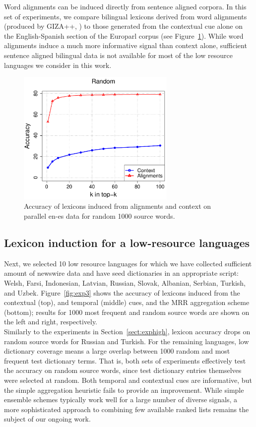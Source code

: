 \documentclass{article}
\newcommand{\mtodo}[1]{}
\newcommand{\secref}[1]{Section~\ref{#1}}
\newcommand{\figref}[1]{Figure~\ref{#1}}
\begin{document}
Word alignments can be induced directly from sentence aligned corpora.  In this set of experiments, we compare bilingual lexicons derived from word alignments (produced by GIZA++, \cite{Och:2003}) to those generated from the contextual cue alone on the English-Spanish section of the Europarl corpus (see \figref{fig:exp2}). While word alignments induce a much more informative signal than context alone, sufficient sentence aligned bilingual data is not available for most of the low resource languages we consider in this work.\\

\begin{figure}[h!]
\centerline{\mbox{\includegraphics[width=3in]{figures/exp2/alignvscontext}}}
\caption{Accuracy of lexicons induced from alignments and context on parallel en-es data for random 1000 source words.}
\label{fig:exp2}
\end{figure}

\subsection{Lexicon induction for a low-resource languages}

Next, we selected 10 low resource languages for which we have collected sufficient amount of newswire data and have seed dictionaries in an appropriate script: Welsh, Farsi, Indonesian, Latvian, Russian, Slovak, Albanian, Serbian, Turkish, and Uzbek.  \figref{fig:exp3} shows the accuracy of lexicons induced from the contextual (top), and temporal (middle) cues, and the MRR aggregation scheme (bottom); results for 1000 most frequent and random source words are shown on the left and right, respectively.\\

Similarly to the experiments in \secref{sect:exphigh}, lexicon accuracy drops on random source words for Russian and Turkish.  For the remaining languages, low dictionary coverage means a large overlap between 1000 random and most frequent test dictionary terms.  That is, both sets of experiments effectively test the accuracy on random source words, since test dictionary entries themselves were selected at random. \mtodo{Confusing? Drop most frequent?}  Both temporal and contextual cues are informative, but the simple aggregation heuristic fails to provide an improvement.  While simple ensemble schemes typically work well for a large number of diverse signals, a more sophisticated approach to combining few available ranked lists remains the subject of our ongoing work.\\
\end{document}
